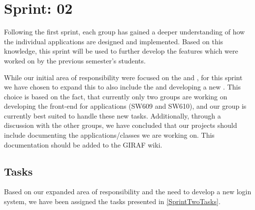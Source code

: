 \chapter{Sprint: 02}
Following the first sprint, each group has gained a deeper understanding of how
the individual applications are designed and implemented. Based on this
knowledge, this sprint will be used to further develop the features which were
worked on by the previous semester's students.\nl

While our initial area of responsibility were focused on the 
and , for this sprint we have chosen to expand this to
also include the  and developing a new . This choice is based on the fact, that currently only two groups are
working on developing the front-end for applications (SW609 and SW610), and our
group is currently best suited to handle these new tasks. Additionally, through
a discussion with the other groups, we have concluded that our projects should
include documenting the applications/classes we are working on. This
documentation should be added to the GIRAF wiki.

\section{Tasks}
Based on our expanded area of responsibility and the need to develop a new login
system, we have been assigned the tasks presented in \autoref{SprintTwoTasks}.


